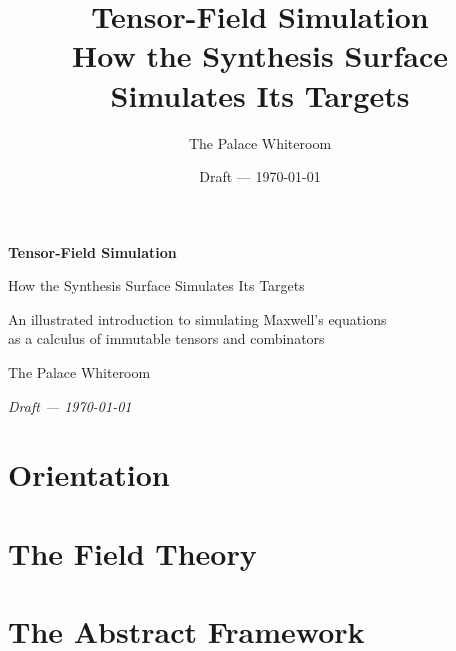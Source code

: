 \documentclass[11pt,letterpaper,oneside,openany]{memoir}
\title{\Huge\bfseries Tensor-Field Simulation\\[2mm]
  \Large How the Synthesis Surface Simulates Its Targets}
\author{The Palace Whiteroom}
\date{Draft --- \today}
\begin{document}
\frontmatter
\begin{titlingpage}
  \centering
  \vspace*{2cm}
  {\Huge\bfseries Tensor-Field Simulation\par}
  \vspace{6mm}
  {\Large How the Synthesis Surface Simulates Its Targets\par}
  \vspace{2cm}
  {\large An illustrated introduction to simulating Maxwell's equations\\
   as a calculus of immutable tensors and combinators\par}
  \vfill
  {\large The Palace Whiteroom\par}
  \vspace{4mm}
  {\itshape Draft --- \today\par}
\end{titlingpage}

\cleardoublepage
\tableofcontents*
\clearpage
\listoffigures*





\mainmatter

\part{Orientation}\label{part:orientation}





\part{The Field Theory}\label{part:fieldtheory}











\part{The Abstract Framework}\label{part:framework}










\end{document}
